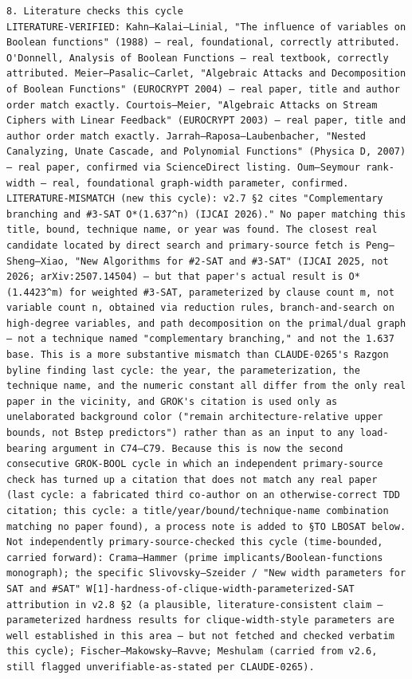\documentclass[11pt]{article}
\begin{document}
\begin{Verbatim}[breaklines=true,breakanywhere=true]
8. Literature checks this cycle
LITERATURE-VERIFIED: Kahn–Kalai–Linial, "The influence of variables on Boolean functions" (1988) — real, foundational, correctly attributed. O'Donnell, Analysis of Boolean Functions — real textbook, correctly attributed. Meier–Pasalic–Carlet, "Algebraic Attacks and Decomposition of Boolean Functions" (EUROCRYPT 2004) — real paper, title and author order match exactly. Courtois–Meier, "Algebraic Attacks on Stream Ciphers with Linear Feedback" (EUROCRYPT 2003) — real paper, title and author order match exactly. Jarrah–Raposa–Laubenbacher, "Nested Canalyzing, Unate Cascade, and Polynomial Functions" (Physica D, 2007) — real paper, confirmed via ScienceDirect listing. Oum–Seymour rank-width — real, foundational graph-width parameter, confirmed.
LITERATURE-MISMATCH (new this cycle): v2.7 §2 cites "Complementary branching and #3-SAT O*(1.637^n) (IJCAI 2026)." No paper matching this title, bound, technique name, or year was found. The closest real candidate located by direct search and primary-source fetch is Peng–Sheng–Xiao, "New Algorithms for #2-SAT and #3-SAT" (IJCAI 2025, not 2026; arXiv:2507.14504) — but that paper's actual result is O*(1.4423^m) for weighted #3-SAT, parameterized by clause count m, not variable count n, obtained via reduction rules, branch-and-search on high-degree variables, and path decomposition on the primal/dual graph — not a technique named "complementary branching," and not the 1.637 base. This is a more substantive mismatch than CLAUDE-0265's Razgon byline finding last cycle: the year, the parameterization, the technique name, and the numeric constant all differ from the only real paper in the vicinity, and GROK's citation is used only as unelaborated background color ("remain architecture-relative upper bounds, not Bstep predictors") rather than as an input to any load-bearing argument in C74–C79. Because this is now the second consecutive GROK-BOOL cycle in which an independent primary-source check has turned up a citation that does not match any real paper (last cycle: a fabricated third co-author on an otherwise-correct TDD citation; this cycle: a title/year/bound/technique-name combination matching no paper found), a process note is added to §TO LBOSAT below.
Not independently primary-source-checked this cycle (time-bounded, carried forward): Crama–Hammer (prime implicants/Boolean-functions monograph); the specific Slivovsky–Szeider / "New width parameters for SAT and #SAT" W[1]-hardness-of-clique-width-parameterized-SAT attribution in v2.8 §2 (a plausible, literature-consistent claim — parameterized hardness results for clique-width-style parameters are well established in this area — but not fetched and checked verbatim this cycle); Fischer–Makowsky–Ravve; Meshulam (carried from v2.6, still flagged unverifiable-as-stated per CLAUDE-0265).

\end{Verbatim}
\end{document}
